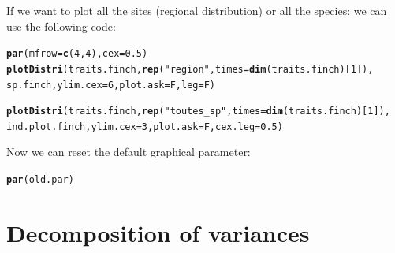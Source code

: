 \documentclass[12pt]{article}\usepackage[]{graphicx}\usepackage[]{color}
\makeatletter
\newcommand{\hlnum}[1]{\textcolor[rgb]{0.686,0.059,0.569}{#1}}%
\newcommand{\hlstr}[1]{\textcolor[rgb]{0.192,0.494,0.8}{#1}}%
\newcommand{\hlstd}[1]{\textcolor[rgb]{0.345,0.345,0.345}{#1}}%
\newcommand{\hlkwc}[1]{\textcolor[rgb]{0.333,0.667,0.333}{#1}}%
\newcommand{\hlkwd}[1]{\textcolor[rgb]{0.737,0.353,0.396}{\textbf{#1}}}%
\newenvironment{kframe}{%
 \def\at@end@of@kframe{}%
 \ifinner\ifhmode%
  \def\at@end@of@kframe{\end{minipage}}%
  \begin{minipage}{\columnwidth}%
 \fi\fi%
 \def\FrameCommand##1{\hskip\@totalleftmargin \hskip-\fboxsep
 \colorbox{shadecolor}{##1}\hskip-\fboxsep
     \hskip-\linewidth \hskip-\@totalleftmargin \hskip\columnwidth}%
 \MakeFramed {\advance\hsize-\width
   \@totalleftmargin\z@ \linewidth\hsize
   \@setminipage}}%
 {\par\unskip\endMakeFramed%
 \at@end@of@kframe}
\newenvironment{knitrout}{}{} %
\makeatother
\begin{document}
If we want to plot all the sites (regional distribution) or all the species: we can use the following code:
\begin{knitrout}
\color{fgcolor}\begin{kframe}
\begin{alltt}
\hlkwd{par}\hlstd{(}\hlkwc{mfrow} \hlstd{=} \hlkwd{c}\hlstd{(}\hlnum{4}\hlstd{,}\hlnum{4}\hlstd{),} \hlkwc{cex} \hlstd{=} \hlnum{0.5}\hlstd{)}
\hlkwd{plotDistri}\hlstd{(traits.finch,} \hlkwd{rep}\hlstd{(}\hlstr{"region"}\hlstd{,} \hlkwc{times} \hlstd{=} \hlkwd{dim}\hlstd{(traits.finch)[}\hlnum{1}\hlstd{]),}
     \hlstd{sp.finch,} \hlkwc{ylim.cex} \hlstd{=} \hlnum{6}\hlstd{,} \hlkwc{plot.ask} \hlstd{= F,} \hlkwc{leg} \hlstd{= F)}
\end{alltt}


{\ttfamily\noindent\bfseries{}}\end{kframe}
\end{knitrout}

\begin{knitrout}
\color{fgcolor}\begin{kframe}
\begin{alltt}
\hlkwd{plotDistri}\hlstd{(traits.finch,} \hlkwd{rep}\hlstd{(}\hlstr{"toutes_sp"}\hlstd{,} \hlkwc{times} \hlstd{=} \hlkwd{dim}\hlstd{(traits.finch)[}\hlnum{1}\hlstd{]),}
     \hlstd{ind.plot.finch,} \hlkwc{ylim.cex} \hlstd{=} \hlnum{3}\hlstd{,} \hlkwc{plot.ask} \hlstd{= F,} \hlkwc{cex.leg} \hlstd{=} \hlnum{0.5}\hlstd{)}
\end{alltt}


{\ttfamily\noindent\bfseries{}}\end{kframe}
\end{knitrout}

Now we can reset the default graphical parameter:
\begin{knitrout}
\color{fgcolor}\begin{kframe}
\begin{alltt}
\hlkwd{par}\hlstd{(old.par)}
\end{alltt}
\end{kframe}
\end{knitrout}
\newpage

\section{Decomposition of variances}
\end{document}
